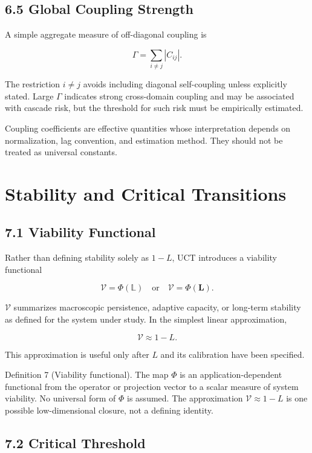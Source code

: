 \subsection{6.5 Global Coupling Strength}

A simple aggregate measure of off-diagonal coupling is

\[ \Gamma=\sum_{i\neq j}|C_{ij}|. \]

The restriction \(i\neq j\) avoids including diagonal self-coupling unless explicitly stated. Large \(\Gamma\) indicates strong cross-domain coupling and may be associated with cascade risk, but the threshold for such risk must be empirically estimated.

Coupling coefficients are effective quantities whose interpretation depends on normalization, lag convention, and estimation method. They should not be treated as universal constants.




\section{Stability and Critical Transitions}


\subsection{7.1 Viability Functional}

Rather than defining stability solely as \(1-L\), UCT introduces a viability functional

\[ \mathcal{V}=\Phi(\mathbb{L}) \quad \text{or} \quad \mathcal{V}=\Phi(\mathbf{L}). \]

\(\mathcal{V}\) summarizes macroscopic persistence, adaptive capacity, or long-term stability as defined for the system under study. In the simplest linear approximation,

\[ \mathcal{V}\approx 1-L. \]

This approximation is useful only after \(L\) and its calibration have been specified.

Definition 7 (Viability functional). The map \(\Phi\) is an application-dependent functional from the operator or projection vector to a scalar measure of system viability. No universal form of \(\Phi\) is assumed. The approximation \(\mathcal{V}\approx 1-L\) is one possible low-dimensional closure, not a defining identity.

\subsection{7.2 Critical Threshold}

